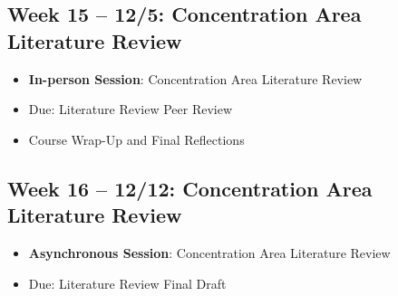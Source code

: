 \documentclass[12pt, letterpaper]{article}
\begin{document}
\subsection*{Week 15 -- 12/5: Concentration Area Literature Review}
\begin{itemize}
    \item \textbf{In-person Session}: Concentration Area Literature Review
    \item Due: Literature Review Peer Review
    \item Course Wrap-Up and Final Reflections
\end{itemize}

\subsection*{Week 16 -- 12/12: Concentration Area Literature Review}
\begin{itemize}
    \item \textbf{Asynchronous Session}: Concentration Area Literature Review
    \item Due: Literature Review Final Draft
\end{itemize}


            \singlespace
            
            
            
\end{document}

